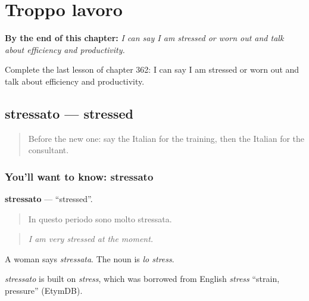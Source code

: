 
\chapter{Troppo lavoro}
\label{ch:it-troppo-lavoro}

\begin{chapteropening}
\textbf{By the end of this chapter:} \emph{I can say I am stressed or worn out and talk about efficiency and productivity.}

Complete the last lesson of chapter 362: I can say I am stressed or worn out and talk about efficiency and productivity.
\end{chapteropening}

\section[stressato]{stressato — stressed}

\label{lesson:IT-C362-stressato}



\begin{quote}
Before the new one: say the Italian for the training, then the Italian for the consultant.
\end{quote}

\subsection*{You'll want to know: stressato}
\textbf{stressato} — \textquotedblleft{}stressed\textquotedblright{}.

\begin{quote}
In questo periodo sono molto stressata.
\end{quote}

\begin{quote}
\emph{I am very stressed at the moment.}
\end{quote}

A woman says \emph{stressata}. The noun is \emph{lo stress}.

\begin{cousinweb}
\emph{stressato} is built on \emph{stress}, which was borrowed from English \emph{stress} \textquotedblleft{}strain, pressure\textquotedblright{} (EtymDB).
\end{cousinweb}

